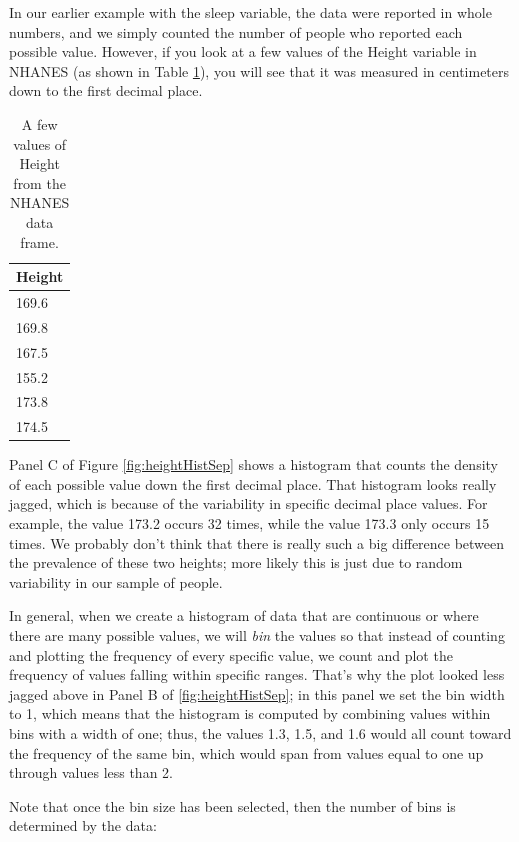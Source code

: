 \documentclass[12pt,]{book}
\theoremstyle{definition}
\theoremstyle{definition}
\theoremstyle{definition}
\theoremstyle{remark}
\begin{document}
In our earlier example with the sleep variable, the data were reported in whole numbers, and we simply counted the number of people who reported each possible value. However, if you look at a few values of the Height variable in NHANES (as shown in Table \ref{tab:heightVals}), you will see that it was measured in centimeters down to the first decimal place.

\begin{table}

\caption{\label{tab:heightVals}A few values of Height from the NHANES data frame.}
\centering
\begin{tabular}[t]{l}
\hline
Height\\
\hline
169.6\\
\hline
169.8\\
\hline
167.5\\
\hline
155.2\\
\hline
173.8\\
\hline
174.5\\
\hline
\end{tabular}
\end{table}

Panel C of Figure \ref{fig:heightHistSep} shows a histogram that counts the density of each possible value down the first decimal place. That histogram looks really jagged, which is because of the variability in specific decimal place values. For example, the value 173.2 occurs 32 times, while the value 173.3 only occurs 15 times. We probably don't think that there is really such a big difference between the prevalence of these two heights; more likely this is just due to random variability in our sample of people.

In general, when we create a histogram of data that are continuous or where there are many possible values, we will \emph{bin} the values so that instead of counting and plotting the frequency of every specific value, we count and plot the frequency of values falling within specific ranges. That's why the plot looked less jagged above in Panel B of \ref{fig:heightHistSep}; in this panel we set the bin width to 1, which means that the histogram is computed by combining values within bins with a width of one; thus, the values 1.3, 1.5, and 1.6 would all count toward the frequency of the same bin, which would span from values equal to one up through values less than 2.

Note that once the bin size has been selected, then the number of bins is determined by the data:
\end{document}
